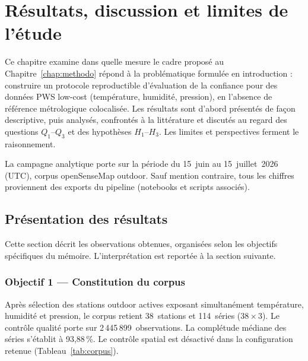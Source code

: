 ﻿\chapter{Résultats, discussion et limites de l'étude}
\label{chap:resultats}

Ce chapitre examine dans quelle mesure le cadre proposé au
Chapitre~\ref{chap:methodo} répond à la problématique formulée en introduction :
construire un protocole reproductible d'évaluation de la confiance pour des
données PWS low-cost (température, humidité, pression), en l'absence de
référence métrologique colocalisée. Les résultats sont d'abord présentés de
façon descriptive, puis analysés, confrontés à la littérature et discutés au
regard des questions $Q_1$--$Q_3$ et des hypothèses $H_1$--$H_3$. Les limites et
perspectives ferment le raisonnement.

La campagne analytique porte sur la période du 15~juin au 15~juillet~2026
(UTC), corpus openSenseMap outdoor. Sauf mention contraire, tous les chiffres
proviennent des exports du pipeline (notebooks et scripts associés).

\section{Présentation des résultats}
\label{sec:presentation}

Cette section décrit les observations obtenues, organisées selon les objectifs
spécifiques du mémoire. L'interprétation est reportée à la section suivante.

\subsection{Objectif 1 --- Constitution du corpus}

Après sélection des stations outdoor actives exposant simultanément
température, humidité et pression, le corpus retient 38~stations et 114~séries
($38 \times 3$). Le contrôle qualité porte sur 2\,445\,899~observations. La
complétude médiane des séries s'établit à 93,88\,\%. Le contrôle spatial est
désactivé dans la configuration retenue (Tableau~\ref{tab:corpus}).


